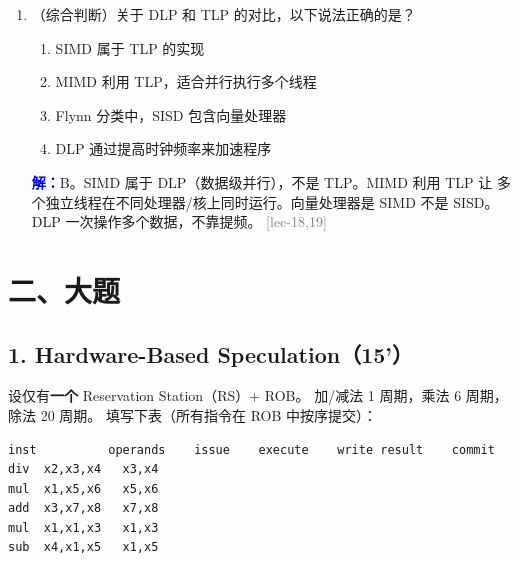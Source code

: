 \documentclass[11pt,a4paper]{article}
\newcommand{\lec}[1]{\textcolor{gray}{[lec-#1]}}
\newcommand{\ans}{\par\noindent\textcolor{blue}{\textbf{解：}}}
\begin{document}
\begin{enumerate}[leftmargin=*,itemsep=8pt]
  \begin{enumerate}[label=\Alph*.]
    \item ROB 在 Commit 阶段才将结果写回寄存器文件
    \item 分支预测失败时，ROB 中错误路径的指令会被 flush
    \item Speculation 允许指令在分支结果确认前执行
    \item Write Result 阶段直接将结果写入寄存器文件
  \end{enumerate}

  \ans D。在 Hardware Speculation 中，Write Result 阶段将结果写入 ROB
  （而非直接写寄存器文件），Commit 阶段才从 ROB 写回寄存器文件。
  这保证了错误的推测结果不会污染体系结构状态。 \lec{03}

\item （综合判断）关于 DLP 和 TLP 的对比，以下说法正确的是？

  \begin{enumerate}[label=\Alph*.]
    \item SIMD 属于 TLP 的实现
    \item MIMD 利用 TLP，适合并行执行多个线程
    \item Flynn 分类中，SISD 包含向量处理器
    \item DLP 通过提高时钟频率来加速程序
  \end{enumerate}

  \ans B。SIMD 属于 DLP（数据级并行），不是 TLP。MIMD 利用 TLP 让
  多个独立线程在不同处理器/核上同时运行。向量处理器是 SIMD 不是 SISD。
  DLP 一次操作多个数据，不靠提频。 \lec{18,19}

\end{enumerate}

\section*{二、大题}

\subsection*{1. Hardware-Based Speculation（15'）}

设仅有\textbf{一个} Reservation Station（RS）+ ROB。
加/减法 1 周期，乘法 6 周期，除法 20 周期。
填写下表（所有指令在 ROB 中按序提交）：

\begin{verbatim}
inst          operands    issue    execute    write result    commit
div  x2,x3,x4   x3,x4
mul  x1,x5,x6   x5,x6
add  x3,x7,x8   x7,x8
mul  x1,x1,x3   x1,x3
sub  x4,x1,x5   x1,x5
\end{verbatim}
\end{document}
